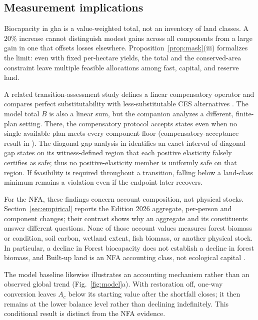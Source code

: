 \documentclass[preprint,12pt,authoryear]{elsarticle}
\begin{document}
\subsection{Measurement implications}

Biocapacity in gha is a value-weighted total, not an inventory of land classes. A $20\%$ increase cannot distinguish modest gains across all components from a large gain in one that offsets losses elsewhere. Proposition~\ref{prop:mask}(iii) formalizes the limit: even with fixed per-hectare yields, the total and the conserved-area constraint leave multiple feasible allocations among fast, capital, and reserve land.

A related transition-assessment study defines a linear compensatory operator and compares perfect substitutability with less-substitutable CES alternatives \citep{Abaee2026b}. The model total $B$ is also a linear sum, but the companion analyzes a different, finite-plan setting. There, the compensatory protocol accepts states even when no single available plan meets every component floor (compensatory-acceptance result in \citealt{Abaee2026b}). The diagonal-gap analysis in \citet{Abaee2026b} identifies an exact interval of diagonal-gap states on its witness-defined region that each positive elasticity falsely certifies as safe; thus no positive-elasticity member is uniformly safe on that region. If feasibility is required throughout a transition, falling below a land-class minimum remains a violation even if the endpoint later recovers.

For the NFA, these findings concern account composition, not physical stocks. Section~\ref{sec:empirical} reports the Edition 2026 aggregate, per-person and component changes; their contrast shows why an aggregate and its constituents answer different questions. None of those account values measures forest biomass or condition, soil carbon, wetland extent, fish biomass, or another physical stock. In particular, a decline in Forest biocapacity does not establish a decline in forest biomass, and Built-up land is an NFA accounting class, not ecological capital \citep{Lo2026NFA,Borucke2013,Blomqvist2013,GiampietroSaltelli2014,Galli2016,vdBerghGrazi2015}.

The model baseline likewise illustrates an accounting mechanism rather than an observed global trend (Fig.~\ref{fig:model}a). With restoration off, one-way conversion leaves $A_c$ below its starting value after the shortfall closes; it then remains at the lower balance level rather than declining indefinitely. This conditional result is distinct from the NFA evidence.
\end{document}

